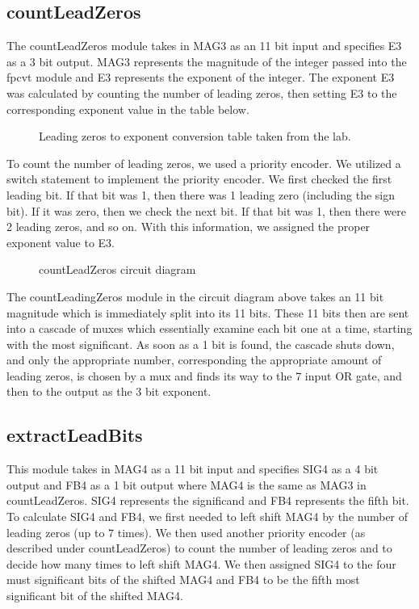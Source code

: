 \documentclass{article}
\begin{document}
\subsection*{countLeadZeros}
The countLeadZeros module takes in MAG3 as an 11 bit input and specifies E3 as a 3 bit output. MAG3 represents the magnitude of the integer passed into the fpcvt module and E3 represents the exponent of the integer. The exponent E3 was calculated by counting the number of leading zeros, then setting E3 to the corresponding exponent value in the table below.

\begin{figure}[H]
	\begin{center}
		\caption{Leading zeros to exponent conversion table taken from the lab.}
	\end{center}
\end{figure}

To count the number of leading zeros, we used a priority encoder. We utilized a switch statement to implement the priority encoder. We first checked the first leading bit. If that bit was 1, then there was 1 leading zero (including the sign bit). If it was zero, then we check the next bit. If that bit was 1, then there were 2 leading zeros, and so on. With this information, we assigned the proper exponent value to E3.

\begin{figure}[H]
	\begin{center}
		\caption{countLeadZeros circuit diagram}
	\end{center}
\end{figure}

The countLeadingZeros module in the circuit diagram above takes an 11 bit magnitude which is immediately split into its 11 bits.  These 11 bits then are sent into a cascade of muxes which essentially examine each bit one at a time, starting with the most significant.  As soon as a 1 bit is found, the cascade shuts down, and only the appropriate number, corresponding the appropriate amount of leading zeros, is chosen by a mux and finds its way to the 7 input OR gate, and then to the output as the 3 bit exponent.

\subsection*{extractLeadBits}
This module takes in MAG4 as a 11 bit input and specifies SIG4 as a 4 bit output and FB4 as a 1 bit output where MAG4 is the same as MAG3 in countLeadZeros. SIG4 represents the significand and FB4 represents the fifth bit. To calculate SIG4 and FB4, we first needed to left shift MAG4 by the number of leading zeros (up to 7 times). We then used another priority encoder (as described under countLeadZeros) to count the number of leading zeros and to decide how many times to left shift MAG4. We then assigned SIG4 to the four must significant bits of the shifted MAG4 and FB4 to be the fifth most significant bit of the shifted MAG4.
\end{document}

